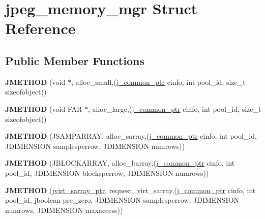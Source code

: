 \hypertarget{structjpeg__memory__mgr}{}\section{jpeg\+\_\+memory\+\_\+mgr Struct Reference}
\label{structjpeg__memory__mgr}
\subsection*{Public Member Functions}
\begin{DoxyCompactItemize}
\item 
{\bfseries J\+M\+E\+T\+H\+OD} (void $\ast$, alloc\+\_\+small,(\hyperlink{structjpeg__common__struct}{j\+\_\+common\+\_\+ptr} cinfo, int pool\+\_\+id, size\+\_\+t sizeofobject))\hypertarget{structjpeg__memory__mgr_a9372ad24444dda23175cc9203105911c}{}\label{structjpeg__memory__mgr_a9372ad24444dda23175cc9203105911c}

\item 
{\bfseries J\+M\+E\+T\+H\+OD} (void F\+AR $\ast$, alloc\+\_\+large,(\hyperlink{structjpeg__common__struct}{j\+\_\+common\+\_\+ptr} cinfo, int pool\+\_\+id,           size\+\_\+t sizeofobject))\hypertarget{structjpeg__memory__mgr_ac0fc5921981d53d30f0c2f5378eafba8}{}\label{structjpeg__memory__mgr_ac0fc5921981d53d30f0c2f5378eafba8}

\item 
{\bfseries J\+M\+E\+T\+H\+OD} (J\+S\+A\+M\+P\+A\+R\+R\+AY, alloc\+\_\+sarray,(\hyperlink{structjpeg__common__struct}{j\+\_\+common\+\_\+ptr} cinfo, int pool\+\_\+id,           J\+D\+I\+M\+E\+N\+S\+I\+ON samplesperrow,           J\+D\+I\+M\+E\+N\+S\+I\+ON numrows))\hypertarget{structjpeg__memory__mgr_a4c1331411b2bacf07985cbea1097fe82}{}\label{structjpeg__memory__mgr_a4c1331411b2bacf07985cbea1097fe82}

\item 
{\bfseries J\+M\+E\+T\+H\+OD} (J\+B\+L\+O\+C\+K\+A\+R\+R\+AY, alloc\+\_\+barray,(\hyperlink{structjpeg__common__struct}{j\+\_\+common\+\_\+ptr} cinfo, int pool\+\_\+id,               J\+D\+I\+M\+E\+N\+S\+I\+ON blocksperrow,               J\+D\+I\+M\+E\+N\+S\+I\+ON numrows))\hypertarget{structjpeg__memory__mgr_af906f909e1ec1154d9a95d6bcee7406b}{}\label{structjpeg__memory__mgr_af906f909e1ec1154d9a95d6bcee7406b}

\item 
{\bfseries J\+M\+E\+T\+H\+OD} (\hyperlink{structjvirt__sarray__control}{jvirt\+\_\+sarray\+\_\+ptr}, request\+\_\+virt\+\_\+sarray,(\hyperlink{structjpeg__common__struct}{j\+\_\+common\+\_\+ptr} cinfo, int pool\+\_\+id, jboolean pre\+\_\+zero, J\+D\+I\+M\+E\+N\+S\+I\+ON samplesperrow, J\+D\+I\+M\+E\+N\+S\+I\+ON numrows, J\+D\+I\+M\+E\+N\+S\+I\+ON maxaccess))\hypertarget{structjpeg__memory__mgr_ade1b19d1ae3bbc87d2f0a259672f6d87}{}\label{structjpeg__memory__mgr_ade1b19d1ae3bbc87d2f0a259672f6d87}


\end{DoxyCompactItemize}

